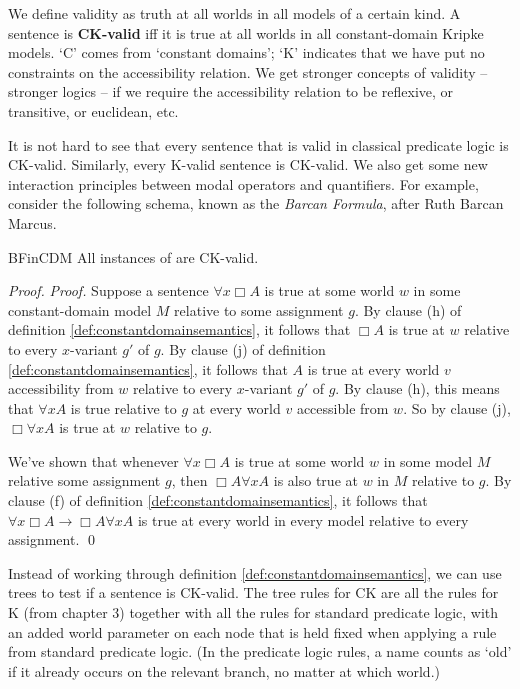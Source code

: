 We define validity as truth at all worlds in all models of a certain kind. A
sentence is \textbf{CK-valid} iff it is true at all worlds in all
constant-domain Kripke models. `C' comes from `constant domains'; `K' indicates
that we have put no constraints on the accessibility relation. We get stronger
concepts of validity -- stronger logics -- if we require the accessibility
relation to be reflexive, or transitive, or euclidean, etc.

It is not hard to see that every sentence that is valid in classical predicate
logic is CK-valid. Similarly, every K-valid sentence is CK-valid. We also get
some new interaction principles between modal operators and quantifiers. For
example, consider the following schema, known as the \emph{Barcan Formula},
after Ruth Barcan Marcus.
%

\begin{observation}{BFinCDM}
  All instances of  are CK-valid.
\end{observation}
\begin{proof}
  \emph{Proof.} Suppose a sentence $\forall x \Box A$ is true at some world $w$
  in some constant-domain model $M$ relative to some assignment $g$. By clause
  (h) of definition \ref{def:constantdomainsemantics}, it follows that $\Box A$
  is true at $w$ relative to every $x$-variant $g'$ of $g$. By clause (j) of
  definition \ref{def:constantdomainsemantics}, it follows that $A$ is true at
  every world $v$ accessibility from $w$ relative to every $x$-variant $g'$ of
  $g$. By clause (h), this means that $\forall x A$ is true relative to $g$ at
  every world $v$ accessible from $w$. So by clause (j), $\Box \forall x A$ is
  true at $w$ relative to $g$.

  We've shown that whenever $\forall x \Box A$ is true at some world $w$ in some
  model $M$ relative some assignment $g$, then $\Box A \forall x A$ is also true
  at $w$ in $M$ relative to $g$. By clause (f) of definition
  \ref{def:constantdomainsemantics}, it follows that
  $\forall x \Box A \to\Box A \forall x A$ is true at every world in every model
  relative to every assignment. \qed
\end{proof}

Instead of working through definition \ref{def:constantdomainsemantics}, we can
use trees to test if a sentence is CK-valid. The tree rules for CK are all the
rules for K (from chapter 3) together with all the rules for standard predicate
logic, with an added world parameter on each node that is held fixed when
applying a rule from standard predicate logic. (In the predicate logic rules, a
name counts as `old' if it already occurs on the relevant branch, no matter at which world.)


